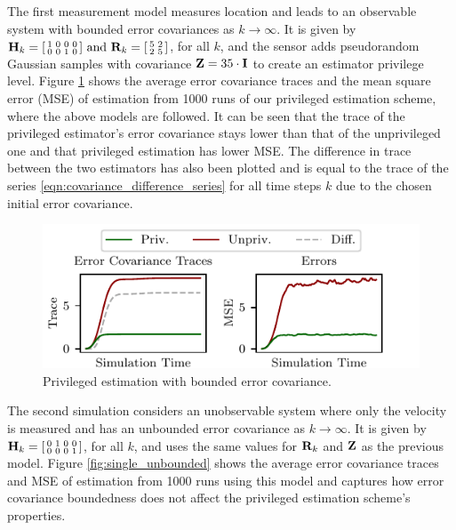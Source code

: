 The first measurement model measures location and leads to an observable system with bounded error covariances as $k \rightarrow \infty$. It is given by 
$
   {{\mathbf{H}}}_k=
   \begin{bsmallmatrix}
      1 & 0 & 0 & 0\\
      0 & 0 & 1 & 0
   \end{bsmallmatrix}
   \text{ and }
   {\ensuremath{{\mathbf{R}}}}_k=
   \begin{bsmallmatrix}
      5 & 2\\
      2 & 5
   \end{bsmallmatrix}
$, 
for all $k$, and the sensor adds pseudorandom Gaussian samples with covariance ${{\mathbf{Z}}}=35 \cdot {\ensuremath{{\mathbf{I}}}}$ to create an estimator privilege level. Figure \ref{fig:single_bounded} shows the average error covariance traces and the mean square error (MSE) of estimation from 1000 runs of our privileged estimation scheme, where the above models are followed. It can be seen that the trace of the privileged estimator's error covariance stays lower than that of the unprivileged one and that privileged estimation has lower MSE. The difference in trace between the two estimators has also been plotted and is equal to the trace of the series \eqref{eqn:covariance_difference_series} for all time steps $k$ due to the chosen initial error covariance.

\begin{figure}[htbp]
   \centering
   \includegraphics{figures/single_level_bounded.pdf}
   \caption{Privileged estimation with bounded error covariance.}
   \label{fig:single_bounded}
\end{figure}

The second simulation considers an unobservable system where only the velocity is measured and has an unbounded error covariance as $k \rightarrow \infty$. It is given by 
$
   {{\mathbf{H}}}_k=
   \begin{bsmallmatrix}
      0 & 1 & 0 & 0\\
      0 & 0 & 0 & 1
   \end{bsmallmatrix}
$, 
for all $k$, and uses the same values for ${{\mathbf{R}}}_k$ and ${{\mathbf{Z}}}$ as the previous model. Figure \ref{fig:single_unbounded} shows the average error covariance traces and MSE of estimation from 1000 runs using this model and captures how error covariance boundedness does not affect the privileged estimation scheme's properties.

